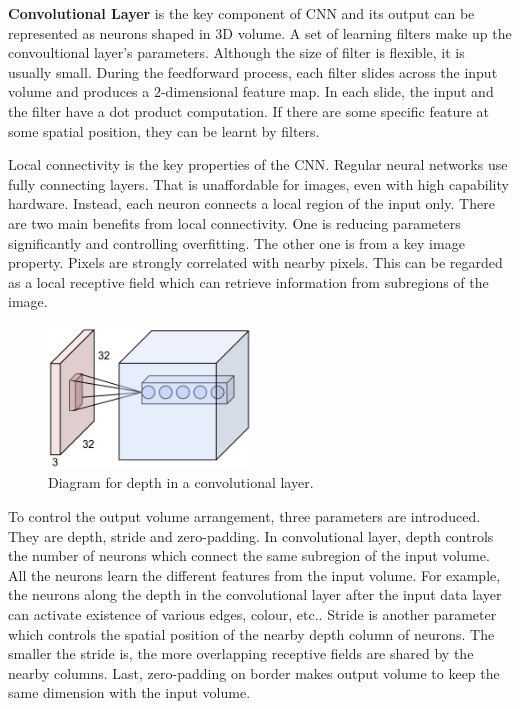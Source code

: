 \textbf{Convolutional Layer} is the key component of CNN and its output can be represented as neurons shaped in 3D volume. A set of learning filters make up the convoultional layer's parameters. Although the size of filter is flexible, it is usually small. During the feedforward process, each filter slides across the input volume and produces a $2$-dimensional feature map. In each slide, the input and the filter have a dot product computation. If there are some specific feature at some spatial position, they can be learnt by filters.

Local connectivity is the key properties of the CNN. Regular neural networks use fully connecting layers. That is unaffordable for images, even with high capability hardware. Instead, each neuron connects a local region of the input only. There are two main benefits from local connectivity. One is reducing parameters significantly and controlling overfitting. The other one is from a key image property. Pixels are strongly correlated with nearby pixels. This can be regarded as a local receptive field which can retrieve information from subregions of the image.

\graphicspath{ {./Figures/} }
\begin{figure}
  \begin{center}
    \includegraphics[width=0.48\textwidth]{depthcol.jpeg}
  \end{center}
  \caption{Diagram for depth in a convolutional layer\citep{CNNDiagram}.}
\end{figure}
To control the output volume arrangement, three parameters are introduced. They are depth, stride and zero-padding. In convolutional layer, depth controls the number of neurons which connect the same subregion of the input volume. All the neurons learn the different features from the input volume. For example, the neurons along the depth in the convolutional layer after the input data layer can activate existence of various edges, colour, etc.. Stride is another parameter which controls the spatial position of the nearby depth column of neurons. The smaller the stride is, the more overlapping receptive fields are shared by the nearby columns. Last, zero-padding on border makes output volume to keep the same dimension with the input volume.

